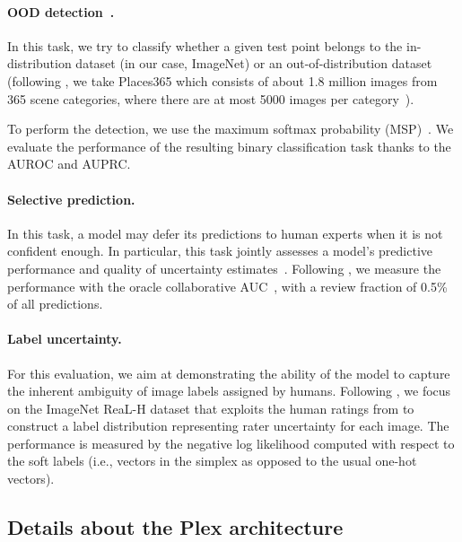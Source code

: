 \documentclass{article}
\begin{document}
\paragraph{OOD detection~\citep{hendrycks2019scaling,fort2021exploring}.} In this task, we try to classify whether a given test point belongs to the in-distribution dataset (in our case, ImageNet) or an out-of-distribution dataset (following \citet{hendrycks2019scaling, tran2022plex}, we take Places365 which consists of about 1.8 million images from 365 scene categories, where there are at most 5000 images per category~\citep{zhou2017places}).

To perform the detection, we use the maximum softmax probability (MSP)~\citep{hendrycks2019scaling, tran2022plex}. We evaluate the performance of the resulting binary classification task thanks to the AUROC and AUPRC.

\paragraph{Selective prediction.}
In this task, a model may defer its predictions to human experts when it is not confident enough.
In particular, this task jointly assesses a model’s predictive performance and quality of
uncertainty estimates~\citep{el2010foundations}. 
Following \citet{tran2022plex}, we measure the performance with the oracle collaborative AUC~\citep{kivlichan2021measuring}, with a review fraction of 0.5\% of all predictions.

\paragraph{Label uncertainty.} For this evaluation, we aim at demonstrating the ability of the model to capture the inherent ambiguity of image labels assigned by humans. Following \citet{tran2022plex}, we focus on the ImageNet ReaL-H dataset that exploits the human ratings from \citet{beyer2020we} to construct a label
distribution representing rater uncertainty for each image. The performance is measured by the negative log likelihood computed with respect to the soft labels (i.e., vectors in the simplex as opposed to the usual one-hot vectors).

\subsection{Details about the Plex architecture}
\end{document}
